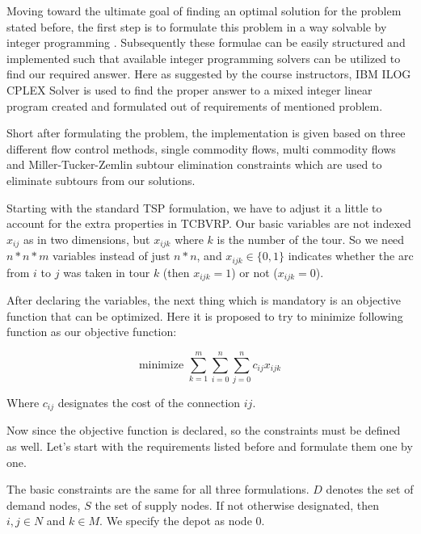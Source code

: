 Moving toward the ultimate goal of finding an optimal solution for the problem
stated before, the first step is to formulate this problem in a way solvable by
integer programming \cite{garfinkel1972integer}. Subsequently these formulae can be easily structured
and implemented such that available integer programming solvers can be utilized to
find our required answer. Here as suggested by the course instructors, IBM ILOG
CPLEX Solver \cite{cplex2009v12}
is used to find the proper answer to a mixed integer linear program created and
formulated out of requirements of mentioned problem.

Short after formulating the problem, the implementation is given based on three
different flow control methods, single commodity flows, multi commodity flows
and Miller-Tucker-Zemlin subtour elimination constraints which are used to
eliminate subtours from our solutions.

Starting with the standard TSP \cite{miller1960integer} formulation, we have to adjust it a
little to account for the extra properties in TCBVRP. Our basic variables are not
indexed $x_{ij}$ as in two dimensions, but $x_{ijk}$ where $k$ is the number
of the tour. So we need $n*n*m$ variables instead of just $n*n$, and $x_{ijk} \in \{0,1\}$
indicates whether the arc from $i$ to $j$ was taken in tour $k$ (then $x_{ijk} = 1$) or
not ($x_{ijk} = 0$).

After declaring the variables, the next thing which is mandatory is an objective function 
that can be optimized. Here it is proposed to try to minimize following function as our
objective function:

\begin{equation}
\mbox{minimize }\sum_{k = 1}^{m} \sum_{i = 0}^{n} \sum_{j = 0}^{n} c_{ij} x_{ijk}
\end{equation}

Where $c_{ij}$ designates the cost of the connection $ij$.

Now since the objective function is declared, so the constraints must be defined
as well. Let's start with the requirements listed before and formulate them one
by one.

The basic constraints are the same for all three formulations. $D$ denotes the
set of demand nodes, $S$ the set of supply nodes. If not otherwise designated,
then $i, j \in N$ and $k \in M$. We specify the depot as node $0$.

